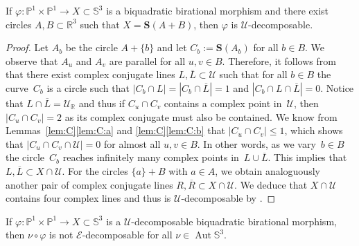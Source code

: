\documentclass[11pt]{article}
\newcommand{\R}{\mathbb{R}}
\renewcommand{\P}{\mathbb{P}}
\renewcommand{\S}{\mathbb{S}}
\newcommand{\bS}{\mathbf{S}}
\newcommand{\cE}{\mathcal{E}}
\newcommand{\cU}{\mathcal{U}}
\newcommand{\oL}{{\overline{L}}}
\newcommand{\oR}{{\overline{R}}}
\renewcommand{\c}{\colon}
\newcommand{\aut}{\operatorname{Aut}}
\newcommand{\st}{such that }
\begin{document}
\begin{proposition}
\label{prp:ABU}
If $\varphi\c\P^1\times\P^1\to X\subset \S^3$ is a biquadratic birational morphism
and there exist circles $A,B\subset\R^3$ \st $X=\bS(A+B)$,
then $\varphi$ is $\cU$-decomposable.
\end{proposition}

\begin{proof}
Let $A_b$ be the circle $A+\{b\}$
and let $C_b:=\bS(A_b)$ for all $b\in B$.
We observe that $A_u$ and $A_v$ are parallel for all $u,v\in B$.
Therefore, it follows from  that
there exist complex conjugate lines $L,\oL\subset \cU$
\st for all $b\in B$
the curve~$C_b$ is a circle \st
$|C_b\cap L|=|C_b\cap\oL|=1$ and
$|C_b\cap L\cap\oL|=0$.
Notice that $L\cap\oL=\cU_\R$
and thus if $C_u\cap C_v$ contains a complex point in~$\cU$,
then $|C_u\cap C_v|=2$ as its complex conjugate must also be contained.
We know from Lemmas~\ref{lem:C}\ref{lem:C:a} and \ref{lem:C}\ref{lem:C:b}
that $|C_u\cap C_v|\leq 1$, which shows that $|C_u\cap C_v\cap\cU|=0$
for almost all $u,v\in B$.
In other words,
as we vary~$b\in B$ the circle~$C_b$ reaches
infinitely many complex points in~$L\cup\oL$.
This implies that $L,\oL\subset X\cap\cU$.
For the circles $\{a\}+B$ with $a\in A$,
we obtain analoguously another pair of complex conjugate lines $R,\oR\subset X\cap\cU$.
We deduce that $X\cap\cU$ contains four complex lines
and thus is $\cU$-decomposable by .
\end{proof}


\begin{proposition}
\label{prp:UE}
If $\varphi\c\P^1\times\P^1\to X\subset \S^3$ is a $\cU$-decomposable biquadratic birational morphism,
then
$\nu\circ\varphi$ is not $\cE$-decomposable for all $\nu\in\aut\S^3$.
\end{proposition}
\end{document}
